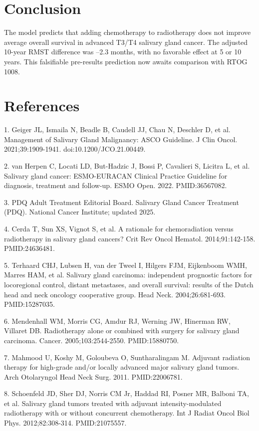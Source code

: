 \documentclass[9pt,twocolumn]{extarticle}
\begin{document}
\section{Conclusion}
The model predicts that adding chemotherapy to radiotherapy does not improve average overall survival in advanced T3/T4 salivary gland cancer. The adjusted 10-year RMST difference was --2.3 months, with no favorable effect at 5 or 10 years. This falsifiable pre-results prediction now awaits comparison with RTOG 1008.\par
\section{References}
1. Geiger JL, Ismaila N, Beadle B, Caudell JJ, Chau N, Deschler D, et al. Management of Salivary Gland Malignancy: ASCO Guideline. J Clin Oncol. 2021;39:1909-1941. doi:10.1200/JCO.21.00449.\par
2. van Herpen C, Locati LD, But-Hadzic J, Bossi P, Cavalieri S, Licitra L, et al. Salivary gland cancer: ESMO-EURACAN Clinical Practice Guideline for diagnosis, treatment and follow-up. ESMO Open. 2022. PMID:36567082.\par
3. PDQ Adult Treatment Editorial Board. Salivary Gland Cancer Treatment (PDQ). National Cancer Institute; updated 2025.\par
4. Cerda T, Sun XS, Vignot S, et al. A rationale for chemoradiation versus radiotherapy in salivary gland cancers? Crit Rev Oncol Hematol. 2014;91:142-158. PMID:24636481.\par
5. Terhaard CHJ, Lubsen H, van der Tweel I, Hilgers FJM, Eijkenboom WMH, Marres HAM, et al. Salivary gland carcinoma: independent prognostic factors for locoregional control, distant metastases, and overall survival: results of the Dutch head and neck oncology cooperative group. Head Neck. 2004;26:681-693. PMID:15287035.\par
6. Mendenhall WM, Morris CG, Amdur RJ, Werning JW, Hinerman RW, Villaret DB. Radiotherapy alone or combined with surgery for salivary gland carcinoma. Cancer. 2005;103:2544-2550. PMID:15880750.\par
7. Mahmood U, Koshy M, Goloubeva O, Suntharalingam M. Adjuvant radiation therapy for high-grade and/or locally advanced major salivary gland tumors. Arch Otolaryngol Head Neck Surg. 2011. PMID:22006781.\par
8. Schoenfeld JD, Sher DJ, Norris CM Jr, Haddad RI, Posner MR, Balboni TA, et al. Salivary gland tumors treated with adjuvant intensity-modulated radiotherapy with or without concurrent chemotherapy. Int J Radiat Oncol Biol Phys. 2012;82:308-314. PMID:21075557.\par
\end{document}
